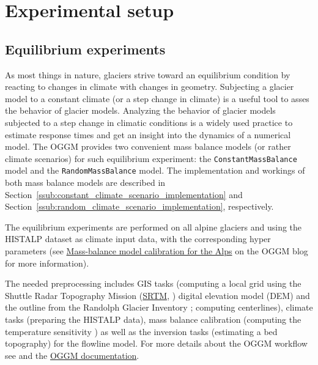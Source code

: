 



\section{Experimental setup} %
\label{sec:experimental_setup}

    \subsection{Equilibrium experiments} %
    \label{sub:equilibrium_experiments_setup}
        As most things in nature, glaciers strive toward an equilibrium condition by reacting to changes in climate with changes in geometry. Subjecting a glacier model to a constant climate (or a step change in climate) is a useful tool to asses the behavior of glacier models. Analyzing the behavior of glacier models subjected to a step change in climatic conditions is a widely used practice to estimate response times and get an insight into the dynamics of a numerical model. The OGGM provides two convenient mass balance models (or rather climate scenarios) for such equilibrium experiment: the \lstinline`ConstantMassBalance` model and the \lstinline`RandomMassBalance` model. The implementation and workings of both mass balance models are described in Section~\ref{ssub:constant_climate_scenario_implementation} and Section~\ref{ssub:random_climate_scenario_implementation}, respectively.

        The equilibrium experiments are performed on all alpine glaciers and using the HISTALP dataset \citep{Auer2007} as climate input data, with the corresponding hyper parameters (see \href{https://oggm.org/2018/08/10/histalp-parameters/}{Mass-balance model calibration for the Alps} on the OGGM blog for more information).

        The needed preprocessing includes GIS tasks (computing a local grid using the Shuttle Radar Topography Mission (\href{http://srtm.csi.cgiar.org/}{SRTM}, \citet{Jarvis2008}) digital elevation model (DEM) and the outline from the Randolph Glacier Inventory \citep{RGI2017,Pfeffer2014}; computing centerlines), climate tasks (preparing the HISTALP data), mass balance calibration (computing the temperature sensitivity \mustar{}) as well as the inversion tasks (estimating a bed topography) for the flowline model. For more details about the OGGM workflow see \citep{Maussion2019} and the \href{https://docs.oggm.org}{OGGM documentation}.

